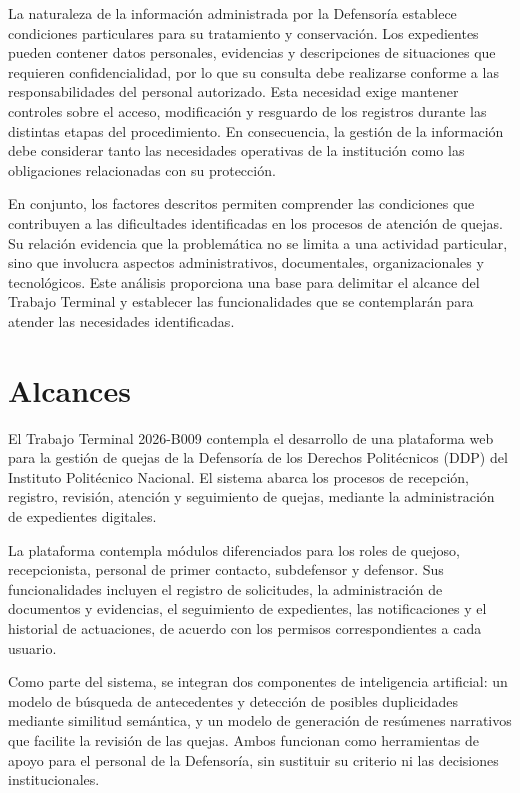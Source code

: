 	La naturaleza de la información administrada por la Defensoría establece condiciones particulares para su tratamiento y conservación. Los expedientes pueden contener datos personales, evidencias y descripciones de situaciones que requieren confidencialidad, por lo que su consulta debe realizarse conforme a las responsabilidades del personal autorizado. Esta necesidad exige mantener controles sobre el acceso, modificación y resguardo de los registros durante las distintas etapas del procedimiento. En consecuencia, la gestión de la información debe considerar tanto las necesidades operativas de la institución como las obligaciones relacionadas con su protección.

	En conjunto, los factores descritos permiten comprender las condiciones que contribuyen a las dificultades identificadas en los procesos de atención de quejas. Su relación evidencia que la problemática no se limita a una actividad particular, sino que involucra aspectos administrativos, documentales, organizacionales y tecnológicos. Este análisis proporciona una base para delimitar el alcance del Trabajo Terminal y establecer las funcionalidades que se contemplarán para atender las necesidades identificadas.
	

\section{Alcances}

El Trabajo Terminal 2026-B009 contempla el desarrollo de una plataforma web para la gestión de quejas de la Defensoría de los Derechos Politécnicos (DDP) del Instituto Politécnico Nacional. El sistema abarca los procesos de recepción, registro, revisión, atención y seguimiento de quejas, mediante la administración de expedientes digitales.

La plataforma contempla módulos diferenciados para los roles de quejoso, recepcionista, personal de primer contacto, subdefensor y defensor. Sus funcionalidades incluyen el registro de solicitudes, la administración de documentos y evidencias, el seguimiento de expedientes, las notificaciones y el historial de actuaciones, de acuerdo con los permisos correspondientes a cada usuario.

Como parte del sistema, se integran dos componentes de inteligencia artificial: un modelo de búsqueda de antecedentes y detección de posibles duplicidades mediante similitud semántica, y un modelo de generación de resúmenes narrativos que facilite la revisión de las quejas. Ambos funcionan como herramientas de apoyo para el personal de la Defensoría, sin sustituir su criterio ni las decisiones institucionales.

